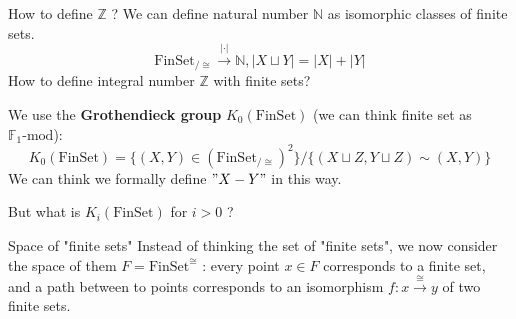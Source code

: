 \documentclass[12pt]{beamer}
\begin{document}
\begin{frame}{How to define $\mathbb{Z}$ ?}
\pause
We can define natural number $\mathbb{N}$ as isomorphic classes of finite sets.
\[
  \mathrm{FinSet}_{/\cong} \xrightarrow{|\cdot|} \mathbb{N}, |X \sqcup Y| = |X|+|Y| 
\]
How to define integral number $\mathbb{Z}$ with finite sets? 

\pause
We use the \textbf{Grothendieck group} $K_0(\mathrm{FinSet})$ (we can think finite set as $\mathbb{F}_1 \text{-}\mathrm{mod}$):
\[
  K_0(\mathrm{FinSet}) = \{ (X,Y)\in (\mathrm{FinSet}_{/\cong})^2   \} / \{ (X \sqcup Z , Y \sqcup Z) \sim (X,Y)\}
\]
We can think we formally define $"X-Y"$ in this way.

\pause
But what is $K_i(\mathrm{FinSet})$ for $i>0$ ?
\end{frame}
\begin{frame}{Space of "finite sets"}
  Instead of thinking the set of "finite sets", we now consider the space of them $F = \mathrm{FinSet}^{\cong}$ : every point $x\in F$ corresponds to a finite set, and a path between to points corresponds to an isomorphism $f:x\xrightarrow{\cong} y$ of two finite sets. 
  \pause

\begin{center}


\begin{tikzpicture}[x=0.75pt,y=0.75pt,yscale=-1,xscale=1]


\end{tikzpicture}
\end{center}
\end{frame}
\end{document}
